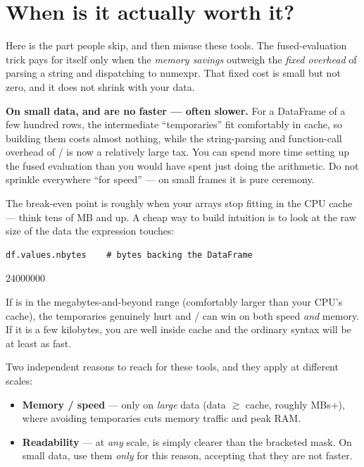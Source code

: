\documentclass[11pt]{article}
\begin{document}
\section{When is it actually worth it?}

Here is the part people skip, and then misuse these tools. The fused-evaluation trick pays for itself only when the \emph{memory savings} outweigh the \emph{fixed overhead} of parsing a string and dispatching to numexpr. That fixed cost is small but not zero, and it does not shrink with your data.

\begin{pitfall}
\textbf{On small data,  and  are no faster --- often slower.} For a DataFrame of a few hundred rows, the intermediate ``temporaries'' fit comfortably in cache, so building them costs almost nothing, while the string-parsing and function-call overhead of / is now a relatively large tax. You can spend more time setting up the fused evaluation than you would have spent just doing the arithmetic. Do not sprinkle  everywhere ``for speed'' --- on small frames it is pure ceremony.
\end{pitfall}

The break-even point is roughly when your arrays stop fitting in the CPU cache --- think tens of MB and up. A cheap way to build intuition is to look at the raw size of the data the expression touches:

\begin{lstlisting}
df.values.nbytes    # bytes backing the DataFrame
\end{lstlisting}

\begin{outblock}
24000000
\end{outblock}

If  is in the megabytes-and-beyond range (comfortably larger than your CPU's cache), the temporaries genuinely hurt and / can win on both speed \emph{and} memory. If it is a few kilobytes, you are well inside cache and the ordinary syntax will be at least as fast.

\begin{keyidea}
Two independent reasons to reach for these tools, and they apply at different scales:
\begin{itemize}
  \item \textbf{Memory / speed} --- only on \emph{large} data (data $\gtrsim$ cache, roughly MBs+), where avoiding temporaries cuts memory traffic and peak RAM.
  \item \textbf{Readability} --- at \emph{any} scale,  is simply clearer than the bracketed mask. On small data, use them \emph{only} for this reason, accepting that they are not faster.
\end{itemize}
\end{keyidea}
\end{document}
